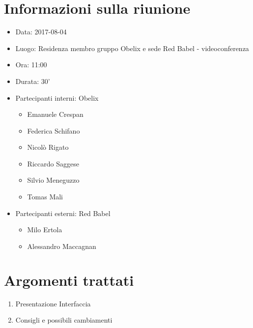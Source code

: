 \documentclass[10 pt,a4paper, openany]{article}
\date{}
\begin{document}
\paginatitolo
\section{Informazioni sulla riunione}

\begin{itemize}
\item[] Data: 2017-08-04
\item[] Luogo: Residenza membro gruppo Obelix e sede Red Babel - videoconferenza
\item[] Ora: 11:00
\item[] Durata: 30'
\item[] Partecipanti interni: Obelix
  \begin{itemize}
  \item[] Emanuele Crespan
  \item[] Federica Schifano
  \item[] Nicolò Rigato
  \item[] Riccardo Saggese
  \item[] Silvio Meneguzzo
  \item[] Tomas Mali
  \end{itemize}
\item[] Partecipanti esterni: Red Babel
  \begin{itemize}
  \item[] Milo Ertola
  \item[] Alessandro Maccagnan
  \end{itemize}
\end{itemize}

\section{Argomenti trattati}

\begin{enumerate}
	\item Presentazione Interfaccia 
	\item Consigli e possibili cambiamenti
\end{enumerate}

	\clearpage
\end{document}

